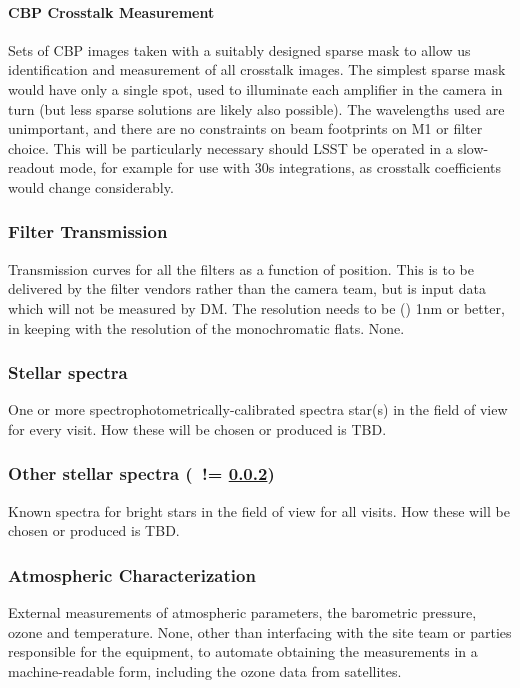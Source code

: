 \paragraph {CBP Crosstalk Measurement}\label{sec:CPP:inputs:CBP:crosstalk}
Sets of CBP images taken with a suitably designed sparse mask to allow us identification and measurement of all crosstalk images. The simplest sparse mask would have only a single spot, used to illuminate each amplifier in the camera in turn (but less sparse solutions are likely also possible). The wavelengths used are unimportant, and there are no constraints on beam footprints on M1 or filter choice. This will be particularly necessary should LSST be operated in a slow-readout mode, for example for use with 30s integrations, as crosstalk coefficients would change considerably.


\subsubsection{Filter Transmission}\label{sec:CPP:inputs:filterTransmission}
Transmission curves for all the filters as a function of position. \Nb This is to be delivered by the filter vendors rather than the camera team, but is input data which will not be measured by DM. The resolution needs to be () 1nm or better, in keeping with the resolution of the monochromatic flats.
\alg None.


\subsubsection{Stellar spectra}\label{sec:CPP:inputs:starSpectrum} 
One or more spectrophotometrically-calibrated spectra star(s) in the field of view for every visit.
\alg How these will be chosen or produced is TBD.


\subsubsection{Other stellar spectra (\nb~!= \ref{sec:CPP:inputs:starSpectrum})}\label{sec:CPP:inputs:standardStarSpectrum}
Known spectra for bright stars in the field of view for all visits.
\alg How these will be chosen or produced is TBD.


\subsubsection{Atmospheric Characterization}\label{sec:CPP:inputs:atmosphericData}
External measurements of atmospheric parameters, \eg the barometric pressure, ozone and temperature.
\alg None, other than interfacing with the site team or parties responsible for the equipment, to automate obtaining the measurements in a machine-readable form, including the ozone data from satellites.


